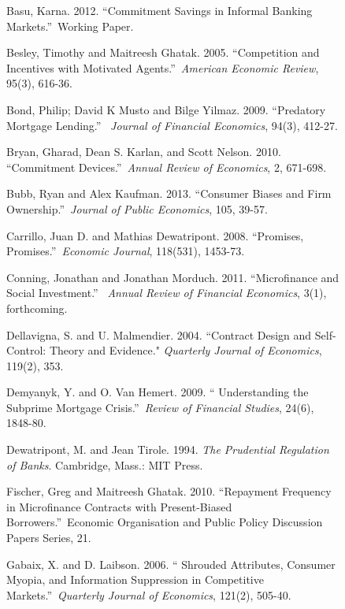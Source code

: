 \documentclass[11pt]{article}%
\begin{document}
\begin{figure}
{\begin{thebibliography}{99}
\bibitem {}Basu, Karna. 2012. \textquotedblleft Commitment Savings in Informal
Banking Markets.\textquotedblright\ Working Paper.

Besley, Timothy and Maitreesh Ghatak. 2005.
\textquotedblleft Competition and Incentives with Motivated
Agents.\textquotedblright\ \textit{American Economic Review}, 95(3), 616-36.

\bibitem {}Bond, Philip; David K Musto and Bilge Yilmaz. 2009.
\textquotedblleft Predatory Mortgage Lending.\textquotedblright%
\ \textit{Journal of Financial Economics}, 94(3), 412-27.

Bryan, Gharad, Dean S. Karlan, and Scott Nelson.
2010. \textquotedblleft Commitment Devices.\textquotedblright\ \textit{Annual
Review of Economics}, 2, 671-698.

Bubb, Ryan and Alex Kaufman. 2013. \textquotedblleft Consumer
Biases and Firm Ownership.\textquotedblright\ \textit{Journal of Public
Economics}, 105, 39-57.

Carrillo, Juan D. and Mathias Dewatripont. 2008.
\textquotedblleft Promises, Promises.\textquotedblright\ \textit{Economic
Journal}, 118(531), 1453-73.

Conning, Jonathan and Jonathan Morduch. 2011.
\textquotedblleft Microfinance and Social Investment.\textquotedblright%
\ \textit{Annual Review of Financial Economics}, 3(1), forthcoming.

\bibitem {}Dellavigna, S. and U. Malmendier. 2004. \textquotedblleft Contract
Design and Self-Control: Theory and Evidence." \textit{Quarterly Journal of
Economics}, 119(2), 353.

\bibitem {}Demyanyk, Y. and O. Van Hemert. 2009. \textquotedblleft
Understanding the Subprime Mortgage Crisis.\textquotedblright\ \textit{Review
of Financial Studies}, 24(6), 1848-80.

Dewatripont, M. and Jean Tirole. 1994. \textit{The
Prudential Regulation of Banks}. Cambridge, Mass.: MIT Press.

Fischer, Greg and Maitreesh Ghatak. 2010.
\textquotedblleft Repayment Frequency in Microfinance Contracts with
Present-Biased Borrowers.\textquotedblright\ Economic Organisation and Public
Policy Discussion Papers Series, 21.

Gabaix, X. and D. Laibson. 2006. \textquotedblleft
Shrouded Attributes, Consumer Myopia, and Information Suppression in
Competitive Markets.\textquotedblright\ \textit{Quarterly Journal of
Economics}, 121(2), 505-40.


\end{thebibliography}}
\end{figure}
\end{document}
